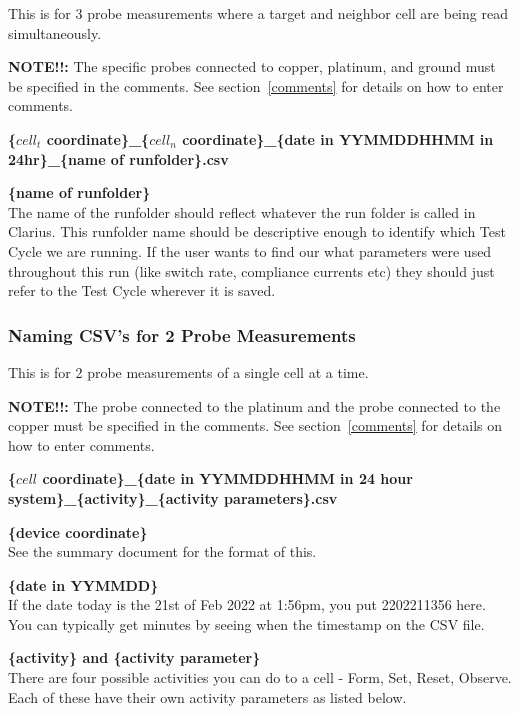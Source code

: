 \documentclass{article}
\begin{document}
          This is for 3 probe measurements where a target and neighbor cell are being read simultaneously.

          \textbf{NOTE!!: } The specific probes connected to copper, platinum, and ground must be specified in the
          comments. See section~\ref{comments} for details on how to enter comments. \\

          \centerline{\textbf{\{$cell_t$ coordinate\}\_\{$cell_n$ coordinate\}\_\{date in YYMMDDHHMM in 24hr\}\_\{name
          of runfolder\}.csv}}

          \textbf{\{name of runfolder\}} \\
          The name of the runfolder should reflect whatever the run folder is called in Clarius. This runfolder name
          should be descriptive enough to identify which Test Cycle we are running. If the user wants to find our what
          parameters were used throughout this run (like switch rate, compliance currents etc) they should just refer to
          the Test Cycle wherever it is saved.

        \subsubsection{Naming CSV's for 2 Probe Measurements}

          This is for 2 probe measurements of a single cell at a time.

          \textbf{NOTE!!: } The probe connected to the platinum and the probe connected to the copper must be specified
          in the comments. See section~\ref{comments} for details on how to enter comments. \\

          \centerline{\textbf{\{$cell$ coordinate\}\_\{date in YYMMDDHHMM in 24 hour system\}\_\{activity\}\_\{activity
          parameters\}.csv}}
          
          \textbf{\{device coordinate\}} \\
          See the summary document for the format of this.

          \textbf{\{date in YYMMDD\}} \\
          If the date today is the 21st of Feb 2022 at 1:56pm, you put 2202211356 here. You can typically get minutes by
          seeing when the timestamp on the CSV file.

          \textbf{\{activity\} and \{activity parameter\}} \\
          There are four possible activities you can do to a cell - Form, Set, Reset, Observe. Each of these have their
          own activity parameters as listed below.
\end{document}
